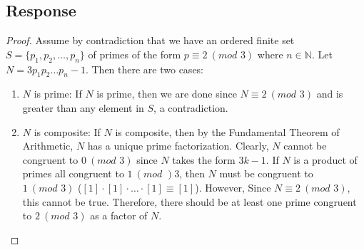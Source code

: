 \documentclass[13pt]{article}
\begin{document}
\subsection*{Response}
\begin{proof}
  Assume by contradiction that we have an ordered finite set $S = \{p_1, p_2, \ldots, p_n\}$ of
  primes of the form $p \equiv 2 \ (\textit{mod } 3)$ where $n \in \mathbb{N}$. Let $N = 3 p_1 p_2
  \ldots p_n - 1$. Then there are two cases:
  \begin{enumerate}[label=\textit{(\roman*)}]
  \item $N$ is prime: If $N$ is prime, then we are done since $N \equiv 2 \ (\textit{mod } 3)$ and
    is greater than any element in $S$, a contradiction.
  \item $N$ is composite: If $N$ is composite, then by the Fundamental Theorem of Arithmetic, $N$
    has a unique prime factorization. Clearly, $N$ cannot be congruent to $0 \ (\textit{mod } 3)$
    since $N$ takes the form $3k - 1$. If $N$ is a product of primes all congruent to $1
    \ (\textit{mod }) 3$, then $N$ must be congruent to $1 \ (\textit{mod } 3)$ ($[1] \cdot [1]
    \cdot \ldots \cdot [1] \equiv [1]$). However, Since $N \equiv 2 \ (\textit{mod } 3)$, this cannot
    be true. Therefore, there should be at least one prime congruent to $2 \ (\textit{mod } 3)$ as a
    factor of $N$.
  \end{enumerate}
\end{proof}
\end{document}
